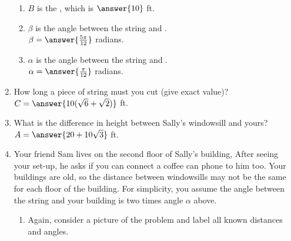 \documentclass{ximera}
\begin{document}
\begin{exercise}
\begin{enumerate}
\begin{enumerate}
\item $B$ is the , which is $\answer{10}$ ft.

\item $\beta$ is the angle between the string and . \smallskip\\
$\beta = \answer{\frac{5\pi}{12}}$ radians.

\item $\alpha$ is the angle between the string and . \smallskip\\
$\alpha = \answer{\frac{\pi}{12}}$ radians.
\end{enumerate}

\item How long a piece of string must you cut (give exact value)? $C = \answer{10(\sqrt{6}+\sqrt{2})}$ ft.

\item What is the difference in height between Sally's windowsill and yours? $A = \answer{20+10\sqrt{3}}$ ft.

\item \begin{exercise}
Your friend Sam lives on the second floor of Sally's building, After seeing your set-up, he asks if you can connect a coffee can phone to him too. 
Your buildings are old, so the distance between windowsills may not be the same for each floor of the building. For simplicity, you assume the angle between the string and your building is two times angle $\alpha$ above.
%
\begin{enumerate}
\item Again, consider a picture of the problem and label all known distances and angles.
\begin{image}[2in]
		\end{image}


\end{enumerate}
\end{exercise}
\end{enumerate}
\end{exercise}
\end{document}
